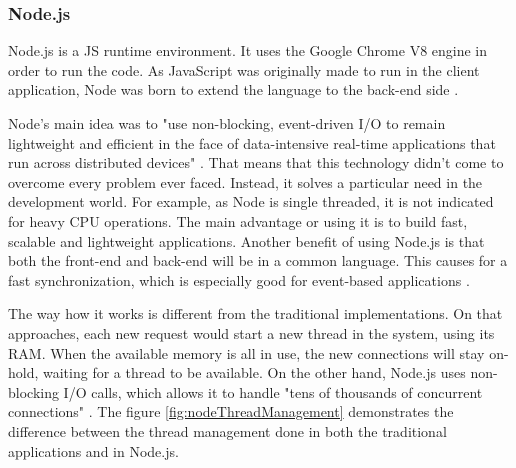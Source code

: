 \subsubsection{Node.js}
\label{sub:StateOfTheArt_Frameworks_Node}
Node.js is a \gls{JS} runtime environment. It uses the Google Chrome V8 engine in order to run the code. As JavaScript was originally made to run in the client application, Node was born to extend the language to the back-end side \parencite{whatIsNodejs}.
\par
Node's main idea was to "use non-blocking, event-driven I/O to remain lightweight and efficient in the face of data-intensive real-time applications that run across distributed devices" \parencite{whyUseNode}. That means that this technology didn't come to overcome every problem ever faced. Instead, it solves a particular need in the development world. For example, as Node is single threaded, it is not indicated for heavy \gls{CPU} operations. The main advantage or using it is to build fast, scalable and lightweight applications. Another benefit of using Node.js is that both the front-end and back-end will be in a common language. This causes for a fast synchronization, which is especially good for event-based applications \parencite{goodAndBadOfNode}. 
\par
The way how it works is different from the traditional implementations. On that approaches, each new request would start a new thread in the system, using its \gls{RAM}. When the available memory is all in use, the new connections will stay on-hold, waiting for a thread to be available. On the other hand, Node.js uses non-blocking I/O calls, which allows it to handle "tens of thousands of concurrent connections" \parencite{whyUseNode}. The figure \ref{fig:nodeThreadManagement} demonstrates the difference between the thread management done in both the traditional applications and in Node.js.
\par


